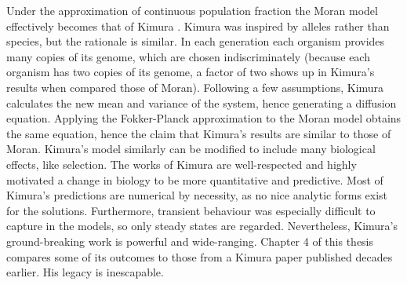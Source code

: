 Under the approximation of continuous population fraction the Moran model effectively becomes that of Kimura \cite{Kimura1983}. 
Kimura was inspired by alleles rather than species, but the rationale is similar. 
In each generation each organism provides many copies of its genome, which are chosen indiscriminately (because each organism has two copies of its genome, a factor of two shows up in Kimura's results when compared those of Moran). 
Following a few assumptions, Kimura calculates the new mean and variance of the system, hence generating a diffusion equation. 
Applying the Fokker-Planck approximation to the Moran model obtains the same equation, hence the claim that Kimura's results are similar to those of Moran. 
Kimura's model similarly can be modified to include many biological effects, like selection. 
The works of Kimura are well-respected and highly motivated a change in biology to be more quantitative and predictive. 
Most of Kimura's predictions are numerical by necessity, as no nice analytic forms exist for the solutions. 
Furthermore, transient behaviour was especially difficult to capture in the models, so only steady states are regarded. 
Nevertheless, Kimura's ground-breaking work is powerful and wide-ranging. 
Chapter 4 of this thesis compares some of its outcomes to those from a Kimura paper published decades earlier. 
His legacy is inescapable. 

